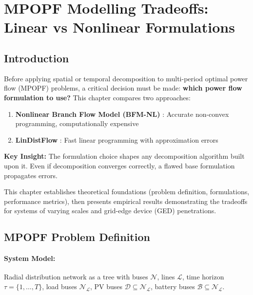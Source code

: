 \clearpage
\section{MPOPF Modelling Tradeoffs: Linear vs Nonlinear Formulations}

\subsection{Introduction}

Before applying spatial or temporal decomposition to multi-period optimal power flow (MPOPF) problems, a critical decision must be made: \textbf{which power flow formulation to use?} This chapter compares two approaches:

\begin{enumerate}
    \item \textbf{Nonlinear Branch Flow Model (BFM-NL)} \cite{Farivar1}: Accurate non-convex programming, computationally expensive
    \item \textbf{LinDistFlow} \cite{Gan}: Fast linear programming with approximation errors
\end{enumerate}

\textbf{Key Insight:} The formulation choice shapes any decomposition algorithm built upon it. Even if decomposition converges correctly, a flawed base formulation propagates errors.

This chapter establishes theoretical foundations (problem definition, formulations, performance metrics), then presents empirical results demonstrating the tradeoffs for systems of varying scales and grid-edge device (GED) penetrations.

\subsection{MPOPF Problem Definition}

\paragraph{System Model:} Radial distribution network as a tree with buses $\mathcal{N}$, lines $\mathcal{L}$, time horizon $\tau = \{1, \ldots, T\}$, load buses $\mathcal{N_L}$, PV buses $\mathcal{D} \subseteq \mathcal{N_L}$, battery buses $\mathcal{B} \subseteq \mathcal{N_L}$.

